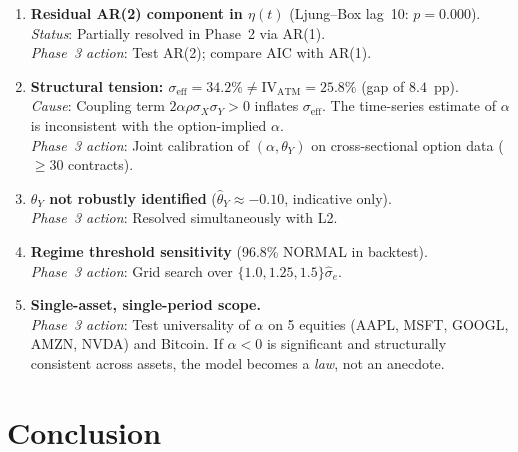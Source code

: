 \documentclass[12pt,a4paper]{article}
\theoremstyle{definition}
\theoremstyle{remark}
\begin{document}
\begin{enumerate}[label=\textbf{L\arabic*.}, leftmargin=2.5em]

  \item \textbf{Residual AR(2) component in $\eta(t)$}
        (Ljung--Box lag~10: $p = 0.000$).\\
        \textit{Status}: Partially resolved in Phase~2 via AR(1).\\
        \textit{Phase~3 action}: Test AR(2); compare AIC with AR(1).

  \item \textbf{Structural tension: $\sigma_{\mathrm{eff}} = 34.2\%
        \neq \mathrm{IV_{ATM}} = 25.8\%$} (gap of $8.4$~pp).\\
        \textit{Cause}: Coupling term $2\alpha\rho\sigma_X\sigma_Y > 0$
        inflates $\sigma_{\mathrm{eff}}$. The time-series estimate of
        $\alpha$ is inconsistent with the option-implied $\alpha$.\\
        \textit{Phase~3 action}: Joint calibration of $(\alpha, \theta_Y)$
        on cross-sectional option data ($\geq 30$ contracts).

  \item \textbf{$\theta_Y$ not robustly identified}
        ($\hat{\theta}_Y \approx -0.10$, indicative only).\\
        \textit{Phase~3 action}: Resolved simultaneously with L2.

  \item \textbf{Regime threshold sensitivity} (96.8\% NORMAL in backtest).\\
        \textit{Phase~3 action}: Grid search over
        $\{1.0, 1.25, 1.5\}\hat{\sigma}_e$.

  \item \textbf{Single-asset, single-period scope.}\\
        \textit{Phase~3 action}: Test universality of $\alpha$ on 5
        equities (AAPL, MSFT, GOOGL, AMZN, NVDA) and Bitcoin.
        If $\alpha < 0$ is significant and structurally consistent
        across assets, the model becomes a \emph{law}, not an anecdote.

\end{enumerate}

\section{Conclusion}
\label{sec:conclusion}
\end{document}

